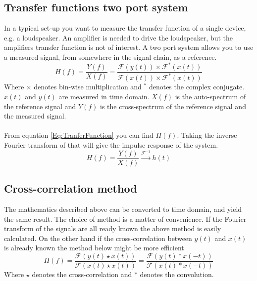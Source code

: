 \subsection{Transfer functions two port system}
In a typical set-up you want to measure the transfer function of a single device, e.g. a loudspeaker. An amplifier is needed to drive the loudspeaker, but the amplifiers transfer function is not of interest. A two port system allows you to use a measured signal, from somewhere in the signal chain, as a reference. 
\begin{equation}
H(f)=\frac{Y(f)}{X(f)}=\frac{\mathscr{F}(y(t))\times\mathscr{F}^{\ast}(x(t))}{\mathscr{F}(x(t))\times\mathscr{F}^{\ast}(x(t))}
\label{Eq:TranferFunctionTwoPort}
\end{equation}
Where $\times$ denotes bin-wise multiplication and $^{\ast}$ denotes the complex conjugate. \\
$x(t)$ and $y(t)$ are measured in time domain. $X(f)$ is the auto-spectrum of the reference signal and $Y(f)$ is the cross-spectrum of the reference signal and the measured signal. \\\\
From equation \ref{Eq:TranferFunction} %
you can find $H(f)$. Taking the inverse Fourier transform of that will give the impulse response of the system. 
\begin{equation}
H(f) = \frac{Y(f)}{X(f)} \xrightarrow{\mathscr{F}^{-1}} h(t)
\label{Eq:Impulseresponse}
\end{equation} 



\subsection{Cross-correlation method}
The mathematics described above can be converted to time domain, and yield the same result. The choice of method is a matter of convenience. If the Fourier transform of the signals are all ready known the above method is easily calculated. On the other hand if the cross-correlation between $y(t)$ and $x(t)$ is already known the method below might be more efficient
\begin{equation}
H(f)=\dfrac{\mathscr{F}(y(t)\star x(t))} {\mathscr{F}(x(t)\star x(t))}=
\dfrac{\mathscr{F}(y(t)\ast x(-t))} {\mathscr{F}(x(t)\ast x(-t))}
\label{Eq:Xcorr method}
\end{equation}  
 Where $\star $ denotes the cross-correlation and $\ast $ denotes the convolution. 
 
